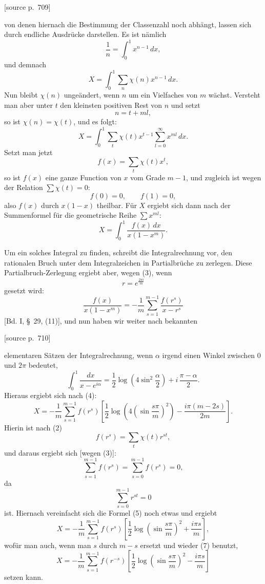 \documentclass[11pt]{article}
\newcommand{\srcpage}[1]{\par\medskip\noindent\textsf{[source p.~#1]}\par\smallskip}
\begin{document}
\srcpage{709}
von denen hiernach die Bestimmung der Classenzahl noch abhängt, lassen sich durch endliche Ausdrücke darstellen. Es ist nämlich
\[
\frac1n=\int_0^1x^{n-1}\,dx,
\]
und demnach
\[
X=\int_0^1\sum_n\chi(n)x^{n-1}\,dx.
\]
Nun bleibt $\chi(n)$ ungeändert, wenn $n$ um ein Vielfaches von $m$ wächst. Versteht man aber unter $t$ den kleinsten positiven Rest von $n$ und setzt
\[
n=t+ml,
\]
so ist $\chi(n)=\chi(t)$, und es folgt:
\[
X=\int_0^1\sum_t\chi(t)x^{t-1}\sum_{l=0}^{\infty}x^{ml}\,dx.
\]
Setzt man jetzt
\begin{equation}
f(x)=\sum_t\chi(t)x^t,
\tag{2}
\end{equation}
so ist $f(x)$ eine ganze Function von $x$ vom Grade $m-1$, und zugleich ist wegen der Relation $\sum\chi(t)=0$:
\begin{equation}
f(0)=0,\qquad f(1)=0,
\tag{3}
\end{equation}
also $f(x)$ durch $x(1-x)$ theilbar. Für $X$ ergiebt sich dann nach der Summenformel für die geometrische Reihe $\sum x^{ml}$:
\begin{equation}
X=\int_0^1\frac{f(x)\,dx}{x(1-x^m)}.
\tag{4}
\end{equation}

Um ein solches Integral zu finden, schreibt die Integralrechnung vor, den rationalen Bruch unter dem Integralzeichen in Partialbrüche zu zerlegen. Diese Partialbruch-Zerlegung ergiebt aber, wegen (3), wenn
\[
r=e^{\frac{2\pi i}{m}}
\]
gesetzt wird:
\[
\frac{f(x)}{x(1-x^m)}
=-\frac1m\sum_{s=1}^{m-1}\frac{f(r^s)}{x-r^s}
\]
[Bd. I, \S~29, (11)], und nun haben wir weiter nach bekannten

\srcpage{710}
elementaren Sätzen der Integralrechnung, wenn $\alpha$ irgend einen Winkel zwischen $0$ und $2\pi$ bedeutet,
\[
\int_0^1\frac{dx}{x-e^{i\alpha}}
=\frac12\log\left(4\sin^2\frac{\alpha}{2}\right)
+i\,\frac{\pi-\alpha}{2}.
\]
Hieraus ergiebt sich nach (4):
\begin{equation}
X=-\frac1m\sum_{s=1}^{m-1}f(r^s)
\left[\frac12\log\left(4\left(\sin\frac{s\pi}{m}\right)^2\right)-\frac{i\pi(m-2s)}{2m}\right].
\tag{5}
\end{equation}
Hierin ist nach (2)
\begin{equation}
f(r^s)=\sum_t\chi(t)r^{st},
\tag{6}
\end{equation}
und daraus ergiebt sich [wegen (3)]:
\begin{equation}
\sum_{s=1}^{m-1}f(r^s)=\sum_{s=0}^{m-1}f(r^s)=0,
\tag{7}
\end{equation}
da
\[
\sum_{s=0}^{m-1}r^{st}=0
\]
ist. Hiernach vereinfacht sich die Formel (5) noch etwas und ergiebt
\begin{equation}
X=-\frac1m\sum_{s=1}^{m-1}f(r^s)
\left[\frac12\log\left(\sin\frac{s\pi}{m}\right)^2+\frac{i\pi s}{m}\right],
\tag{8}
\end{equation}
wofür man auch, wenn man $s$ durch $m-s$ ersetzt und wieder (7) benutzt,
\begin{equation}
X=-\frac1m\sum_{s=1}^{m-1}f(r^{-s})
\left[\frac12\log\left(\sin\frac{s\pi}{m}\right)^2-\frac{i\pi s}{m}\right]
\tag{9}
\end{equation}
setzen kann.
\end{document}
